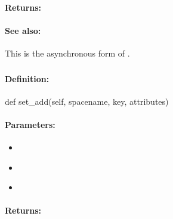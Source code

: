 \paragraph{Returns:}


\paragraph{See also:}  This is the asynchronous form of .

\pagebreak
\subsubsection{}
\label{api:python:set_add}


\paragraph{Definition:}
\begin{pythoncode}
def set_add(self, spacename, key, attributes)
\end{pythoncode}

\paragraph{Parameters:}
\begin{itemize}[noitemsep]
\item {}\\

\item {}\\

\item {}\\

\end{itemize}

\paragraph{Returns:}


\pagebreak
\subsubsection{}
\label{api:python:async_set_add}


